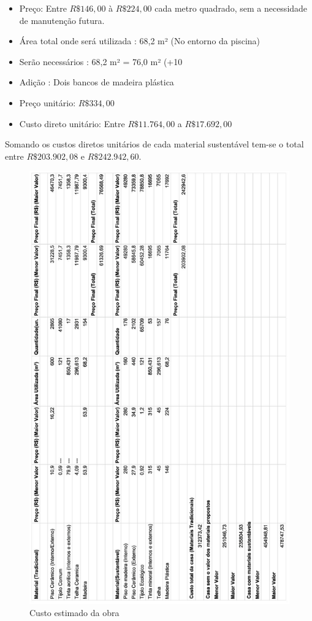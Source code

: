 \begin{itemize}

		\item Preço: Entre $R\$146,00$ à $R\$ 224,00$ cada metro quadrado, sem a necessidade de manutenção futura.

		\item Área total onde será utilizada : 68,2 m² (No entorno da piscina)

		\item Serão necessários :  68,2 m² = 76,0 m² (+10%

		\item Adição : Dois bancos de madeira plástica

		\item Preço unitário: $R\$ 334,00$

		\item Custo direto unitário: Entre $R\$ 11.764,00$ a $R\$17.692,00$

\end{itemize}


Somando os custos diretos unitários de cada material sustentável tem-se o total entre $R\$ 203.902,08$ e $R\$ 242.942,60$.

\begin{figure}[H]
\begin{sideways}
	\includegraphics[keepaspectratio,scale=0.5,angle=270]{figuras/custos_da_casa.eps}
\end{sideways}
	\caption{Custo estimado da obra}
\end{figure}

